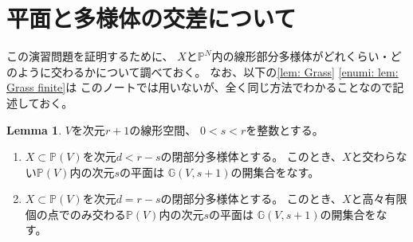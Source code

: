 \documentclass[uplatex]{jsarticle}
\theoremstyle{definition}
\newtheorem{lem}[lem]{Lemma}
\newcommand{\G}{\mathbb{G}}
\renewcommand{\P}{\mathbb{P}}
\begin{document}
\section{平面と多様体の交差について}

この演習問題を証明するために、
\(X\)と\(\P^N\)内の線形部分多様体がどれくらい・どのように交わるかについて調べておく。
なお、以下の\autoref{lem: Grass} \ref{enumi: lem: Grass finite}は
このノートでは用いないが、全く同じ方法でわかることなので記述しておく。


\begin{lem}\label{lem: Grass}
  \(V\)を次元\(r+1\)の線形空間、
  \(0 < s < r\)を整数とする。
  \begin{enumerate}
    \item \label{enumi: lem: Grass empty}
    \(X\subset \P(V)\)を次元\(d < r-s\)の閉部分多様体とする。
    このとき、\(X\)と交わらない\(\P(V)\)内の次元\(s\)の平面は
    \(\G(V,s+1)\)の開集合をなす。
    \item \label{enumi: lem: Grass finite}
    \(X\subset \P(V)\)を次元\(d = r-s\)の閉部分多様体とする。
    このとき、\(X\)と高々有限個の点でのみ交わる\(\P(V)\)内の次元\(s\)の平面は
    \(\G(V,s+1)\)の開集合をなす。
  \end{enumerate}
\end{lem}
\end{document}
